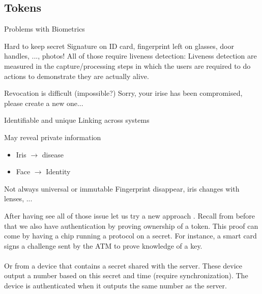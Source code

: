 \subsection{Tokens}
\begin{parag}{Problems with Biometrics}
    \begin{subparag}{Hard to keep secret}
        Signature on ID card, fingerprint left on glasses, door handles, ..., photos! All of those require liveness detection: Liveness detection are measured in the capture/processing steps in which the users are required to do actions to demonstrate they are actually alive. 
    \end{subparag}
	\begin{subparag}{Revocation is difficult (impossible?)}
		Sorry, your irise has been compromised, please create a new one...
	\end{subparag}
	\begin{subparag}{Identifiable and unique}
	    Linking across systems
	\end{subparag}
	\begin{subparag}{May reveal private information}
	    
		\begin{itemize}
		    \item Iris $\to$ disease
		    \item Face $\to$ Identity
		\end{itemize}
		
	\end{subparag}

	\begin{subparag}{Not always universal or immutable}
	    Fingerprint disappear, iris changes with lenses, ...
	\end{subparag}
\end{parag}
After having see all of those issue let us try a new approach . Recall from before that we also have authentication by proving ownership of a token. This proof can come by having a chip running a protocol on a secret. For instance, a smart card signs a challenge sent by the ATM to prove knowledge of a key.\\
$ $\\
Or from a device that contains a secret shared with the server. These device output a number based on this secret and time (require synchronization). The device is authenticated when it outputs the same number as the server.
